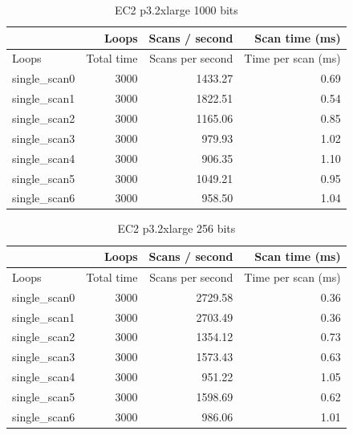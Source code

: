 \begin{table}[!htb]
\centering
\begin{tabular}{| l | r | r | r |}
    \hline
    & Loops & Scans / second & Scan time (ms) \\ \hline
    Loops & Total time & Scans per second & Time per scan (ms) \\
    single\_scan0 & 3000 & 1433.27 & 0.69 \\
    single\_scan1 & 3000 & 1822.51 & 0.54 \\
    single\_scan2 & 3000 & 1165.06 & 0.85 \\
    single\_scan3 & 3000 & 979.93 & 1.02 \\
    single\_scan4 & 3000 & 906.35 & 1.10 \\
    single\_scan5 & 3000 & 1049.21 & 0.95 \\
    single\_scan6 & 3000 & 958.50 & 1.04 \\
\end{tabular}
\caption{EC2 p3.2xlarge 1000 bits
\label{tab:perf-imac-256}}
\end{table}

\begin{table}[!htb]
\centering
\begin{tabular}{| l | r | r | r |}
    \hline
    & Loops & Scans / second & Scan time (ms) \\ \hline
    Loops & Total time & Scans per second & Time per scan (ms) \\
    single\_scan0 & 3000 & 2729.58 & 0.36 \\
    single\_scan1 & 3000 & 2703.49 & 0.36 \\
    single\_scan2 & 3000 & 1354.12 & 0.73 \\
    single\_scan3 & 3000 & 1573.43 & 0.63 \\
    single\_scan4 & 3000 & 951.22 & 1.05 \\
    single\_scan5 & 3000 & 1598.69 & 0.62 \\
    single\_scan6 & 3000 & 986.06 & 1.01 \\
\end{tabular}
\caption{EC2 p3.2xlarge 256 bits
\label{tab:perf-imac-256}}
\end{table}


